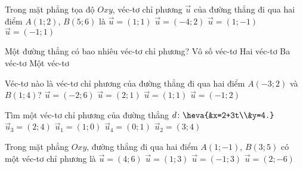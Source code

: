 \begin{ex}%
	Trong mặt phẳng tọa độ $Oxy$, véc-tơ chỉ phương $\overrightarrow{u}$ của đường thẳng đi qua hai điểm $A(1;2)$, $B(5;6)$ là
	\choice
	{\True $\overrightarrow{u}=(1;1)$}
	{$\overrightarrow{u}=(-4;2)$}
	{$\overrightarrow{u}=(1;-1)$}
	{$\overrightarrow{u}=(-1;1)$}
\end{ex}


\begin{ex}%
	Một đường thẳng có bao nhiêu véc-tơ chỉ phương?
	\choice
	{\True Vô số véc-tơ}
	{Hai véc-tơ}
	{Ba véc-tơ}
	{Một véc-tơ}
\end{ex}


\begin{ex}%
	Véc-tơ nào là véc-tơ chỉ phương của đường thẳng đi qua hai điểm $A(-3;2)$ và $B(1;4)$?
	\choice
	{$\overrightarrow{u}=(-2;6)$}
	{\True $\overrightarrow{u}=(2;1)$}
	{$\overrightarrow{u}=(1;1)$}
	{$\overrightarrow{u}=(-1;2)$}
\end{ex}


\begin{ex}%
	Tìm một véc-tơ chỉ phương của đường thẳng $d \colon \heva{&x=2+3t\\&y=4.}$
	\choice
	{$\overrightarrow{u}_3=(2;4)$}
	{\True $\overrightarrow{u}_1=(1;0)$}
	{$\overrightarrow{u}_4=(0;1)$}
	{$\overrightarrow{u}_2=(3;4)$}
\end{ex}


\begin{ex}%
	Trong mặt phẳng $Oxy$, đường thẳng đi qua hai điểm $A(1;-1)$, $B(3;5)$ có một véc-tơ chỉ phương là
	\choice
	{$\overrightarrow{u}=(4;6)$}
	{\True $\overrightarrow{u}=(1;3)$}
	{$\overrightarrow{u}=(-1;3)$}
	{$\overrightarrow{u}=(2;-6)$}
\end{ex}


